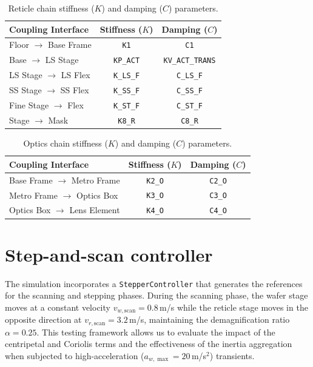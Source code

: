 \documentclass[11pt,letterpaper]{article}
\begin{document}
\begin{table}[H]
\centering
\caption{Reticle chain stiffness ($K$) and damping ($C$) parameters.}
\label{tab:reticle}
\begin{tabular}{lcc}
\toprule
Coupling Interface & Stiffness ($K$) & Damping ($C$) \\
\midrule
Floor $\rightarrow$ Base Frame  & \texttt{K1}       & \texttt{C1} \\
Base $\rightarrow$ LS Stage     & \texttt{KP\_ACT}  & \texttt{KV\_ACT\_TRANS} \\
LS Stage $\rightarrow$ LS Flex  & \texttt{K\_LS\_F} & \texttt{C\_LS\_F} \\
SS Stage $\rightarrow$ SS Flex  & \texttt{K\_SS\_F} & \texttt{C\_SS\_F} \\
Fine Stage $\rightarrow$ Flex   & \texttt{K\_ST\_F} & \texttt{C\_ST\_F} \\
Stage $\rightarrow$ Mask        & \texttt{K8\_R}    & \texttt{C8\_R} \\
\bottomrule
\end{tabular}
\end{table}

\begin{table}[H]
\centering
\caption{Optics chain stiffness ($K$) and damping ($C$) parameters.}
\label{tab:optics}
\begin{tabular}{lcc}
\toprule
Coupling Interface & Stiffness ($K$) & Damping ($C$) \\
\midrule
Base Frame $\rightarrow$ Metro Frame  & \texttt{K2\_O} & \texttt{C2\_O} \\
Metro Frame $\rightarrow$ Optics Box  & \texttt{K3\_O} & \texttt{C3\_O} \\
Optics Box $\rightarrow$ Lens Element & \texttt{K4\_O} & \texttt{C4\_O} \\
\bottomrule
\end{tabular}
\end{table}

\section*{Step-and-scan controller}

The simulation incorporates a \texttt{StepperController} that generates the references for the scanning and stepping phases. During the scanning phase, the wafer stage moves at a constant velocity $v_{w,\text{scan}} = 0.8$\,m/s while the reticle stage moves in the opposite direction at $v_{r,\text{scan}} = 3.2$\,m/s, maintaining the demagnification ratio $\alpha = 0.25$. This testing framework allows us to evaluate the impact of the centripetal and Coriolis terms and the effectiveness of the inertia aggregation when subjected to high-acceleration ($a_{w,\max} = 20$\,m/s$^2$) transients.
\end{document}
